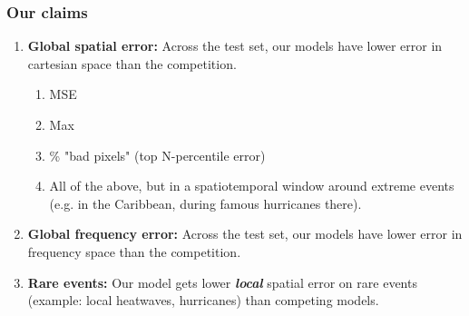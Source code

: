 \subsubsection{Our claims}
\begin{enumerate}
    \item \textbf{Global spatial error:} Across the test set, our models have lower error in cartesian space than the competition.
    \begin{enumerate}
        \item MSE
        \item Max
        \item \% "bad pixels" (top N-percentile error)
        \item All of the above, but in a spatiotemporal window around extreme events (e.g. in the Caribbean, during famous hurricanes there).
    \end{enumerate}
    \item \textbf{Global frequency error:} Across the test set, our models have lower error in frequency space than the competition.
    \item \textbf{Rare events:} Our model gets lower \textbf{\emph{local}} spatial error on rare events (example: local heatwaves, hurricanes) than competing models.
\end{enumerate}

